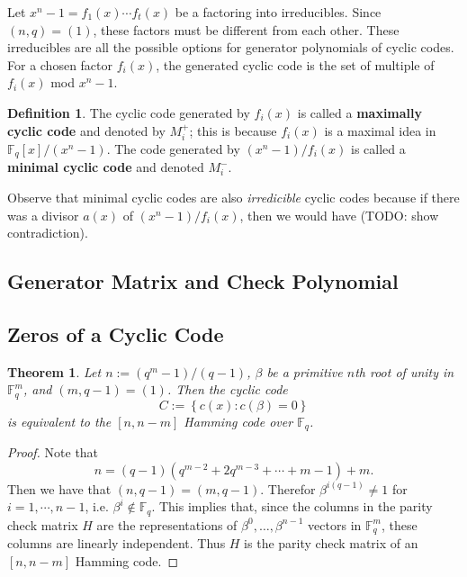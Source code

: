 \documentclass{article}
\newcommand{\F}{\mathbb{F}}
\renewcommand{\=}{\equiv}
\newcommand{\set}[1]{\left\{ #1 \right\}}
\theoremstyle{plain}
\newtheorem{thm}{Theorem}[subsection]
\theoremstyle{definition}
\newtheorem{defn}{Definition}[subsection]
\newcommand{\TODO}[1]{(TODO: #1)}
\begin{document}
Let $x^n - 1 = f_1(x) \cdots f_t(x)$ be a factoring into irreducibles.
Since $(n, q) = (1)$, these factors must be different from each other.
These irreducibles are all the possible options for generator polynomials of cyclic codes.
For a chosen factor $f_i(x)$, the generated cyclic code is the set of multiple of $f_i(x)$ mod $x^n - 1$.

\begin{defn}
  \label{def:cyclic-generator}
  The cyclic code generated by $f_i(x)$ is called a \textbf{maximally cyclic code} and denoted by $M_i^+$; this is because $f_i(x)$ is a maximal idea in $\F_q[x]/(x^n-1)$.
  The code generated by $(x^n-1)/f_i(x)$ is called a \textbf{minimal cyclic code} and denoted $M_i^-$.
\end{defn}

Observe that minimal cyclic codes are also \textit{irredicible} cyclic codes because if there was a divisor $a(x)$ of $(x^n-1)/f_i(x)$, then we would have \TODO{show contradiction}.

\subsection{Generator Matrix and Check Polynomial}

\subsection{Zeros of a Cyclic Code}

\begin{thm}
Let $n := (q^m - 1)/(q - 1)$, $\beta$ be a primitive $n$th root of unity in $\F_q^m$, and $(m, q-1) = (1)$.
Then the cyclic code
$$ C := \set{ c(x) : c(\beta) = 0 } $$
is equivalent to the $[n, n-m]$ Hamming code over $\F_q$.
\end{thm}
\begin{proof}
Note that
$$ n = (q-1) (q^{m-2} + 2q^{m-3} + \cdots + m - 1) + m. $$
Then we have that $(n, q-1) = (m, q-1)$.
Therefor $\beta^{i(q-1)} \neq 1$ for $i = 1, \cdots, n-1$, i.e. $\beta^i \not\in \F_q$.
This implies that, since the columns in the parity check matrix $H$ are the representations of $\beta^0, \dots, \beta^{n-1}$ vectors in $\F_q^m$, these columns are linearly independent.
Thus $H$ is the parity check matrix of an $[n, n-m]$ Hamming code.
\end{proof}
\end{document}
